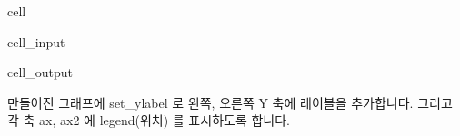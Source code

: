 \documentclass[letterpaper,10pt,english]{jupyterBook}
\begin{document}
\begin{sphinxuseclass}{cell}\begin{sphinxVerbatimInput}

\begin{sphinxuseclass}{cell_input}
\begin{sphinxVerbatim}[commandchars=\\\{\}]
   
\PYG{p}{[}\PYG{p}{]} 
  
\PYG{p}{[}\PYG{p}{]} 
\end{sphinxVerbatim}

\end{sphinxuseclass}\end{sphinxVerbatimInput}
\begin{sphinxVerbatimOutput}

\begin{sphinxuseclass}{cell_output}
\noindent{}

\end{sphinxuseclass}\end{sphinxVerbatimOutput}

\end{sphinxuseclass}
\sphinxAtStartPar
 만들어진 그래프에 set\_ylabel 로 왼쪽, 오른쪽 Y 축에 레이블을 추가합니다. 그리고  각 축 ax, ax2 에 legend(위치) 를 표시하도록 합니다.
\end{document}
